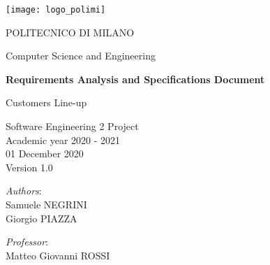 \begin{titlingpage}
	\begin{center}
		\texttt{[image: logo\_polimi]}
		
		\vspace{0.25cm}
		
		\LARGE POLITECNICO DI MILANO\\
		
		\vspace{0.2cm}
		
		\Large Computer Science and Engineering
		
		\vspace{0.8cm}
	
		\Huge \textbf{Requirements Analysis and Specifications Document}
		
		\vspace{0.5cm}
		\huge Customers Line-up
		
		\vspace{1.5cm}
		\LARGE Software Engineering 2 Project\\
		\Large Academic year 2020 - 2021\\
		\vspace{1cm}
		01 December 2020\\Version 1.0
		\vspace{3cm}
		
		\large
		\begin{minipage}{.1\textwidth}
			\null
		\end{minipage}%
		\begin{minipage}{.4\textwidth}
			\textit{Authors}:\\
			Samuele NEGRINI\\
			Giorgio PIAZZA
		\end{minipage}%
		\begin{minipage}{.4\textwidth}
			\raggedleft	
			\textit{Professor}:\\
			Matteo Giovanni ROSSI\\
			\phantom{placeholder}
		\end{minipage}%
		\begin{minipage}{.1\textwidth}
			\null
		\end{minipage}
	
			
		\end{center}
\end{titlingpage}
